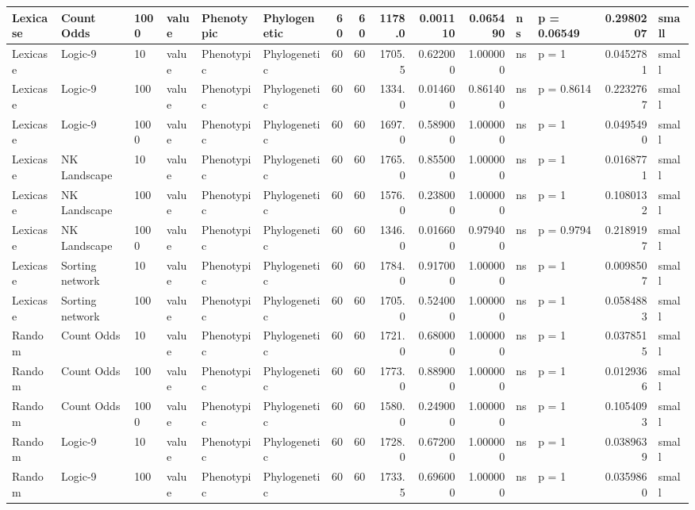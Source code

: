 \documentclass[]{book}
\begin{document}
\begin{table}
\begin{tabular}[t]{l|l|l|l|l|l|r|r|r|r|r|l|l|r|l}
\hline
Lexicase & Count Odds & 1000 & value & Phenotypic & Phylogenetic & 60 & 60 & 1178.0 & 0.001110 & 0.065490 & ns & p = 0.06549 & 0.2980207 & small\\
\hline
Lexicase & Logic-9 & 10 & value & Phenotypic & Phylogenetic & 60 & 60 & 1705.5 & 0.622000 & 1.000000 & ns & p = 1 & 0.0452781 & small\\
\hline
Lexicase & Logic-9 & 100 & value & Phenotypic & Phylogenetic & 60 & 60 & 1334.0 & 0.014600 & 0.861400 & ns & p = 0.8614 & 0.2232767 & small\\
\hline
Lexicase & Logic-9 & 1000 & value & Phenotypic & Phylogenetic & 60 & 60 & 1697.0 & 0.589000 & 1.000000 & ns & p = 1 & 0.0495490 & small\\
\hline
Lexicase & NK Landscape & 10 & value & Phenotypic & Phylogenetic & 60 & 60 & 1765.0 & 0.855000 & 1.000000 & ns & p = 1 & 0.0168771 & small\\
\hline
Lexicase & NK Landscape & 100 & value & Phenotypic & Phylogenetic & 60 & 60 & 1576.0 & 0.238000 & 1.000000 & ns & p = 1 & 0.1080132 & small\\
\hline
Lexicase & NK Landscape & 1000 & value & Phenotypic & Phylogenetic & 60 & 60 & 1346.0 & 0.016600 & 0.979400 & ns & p = 0.9794 & 0.2189197 & small\\
\hline
Lexicase & Sorting network & 10 & value & Phenotypic & Phylogenetic & 60 & 60 & 1784.0 & 0.917000 & 1.000000 & ns & p = 1 & 0.0098507 & small\\
\hline
Lexicase & Sorting network & 100 & value & Phenotypic & Phylogenetic & 60 & 60 & 1705.0 & 0.524000 & 1.000000 & ns & p = 1 & 0.0584883 & small\\
\hline
Random & Count Odds & 10 & value & Phenotypic & Phylogenetic & 60 & 60 & 1721.0 & 0.680000 & 1.000000 & ns & p = 1 & 0.0378515 & small\\
\hline
Random & Count Odds & 100 & value & Phenotypic & Phylogenetic & 60 & 60 & 1773.0 & 0.889000 & 1.000000 & ns & p = 1 & 0.0129366 & small\\
\hline
Random & Count Odds & 1000 & value & Phenotypic & Phylogenetic & 60 & 60 & 1580.0 & 0.249000 & 1.000000 & ns & p = 1 & 0.1054093 & small\\
\hline
Random & Logic-9 & 10 & value & Phenotypic & Phylogenetic & 60 & 60 & 1728.0 & 0.672000 & 1.000000 & ns & p = 1 & 0.0389639 & small\\
\hline
Random & Logic-9 & 100 & value & Phenotypic & Phylogenetic & 60 & 60 & 1733.5 & 0.696000 & 1.000000 & ns & p = 1 & 0.0359860 & small\\

\end{tabular}
\end{table}
\end{document}
